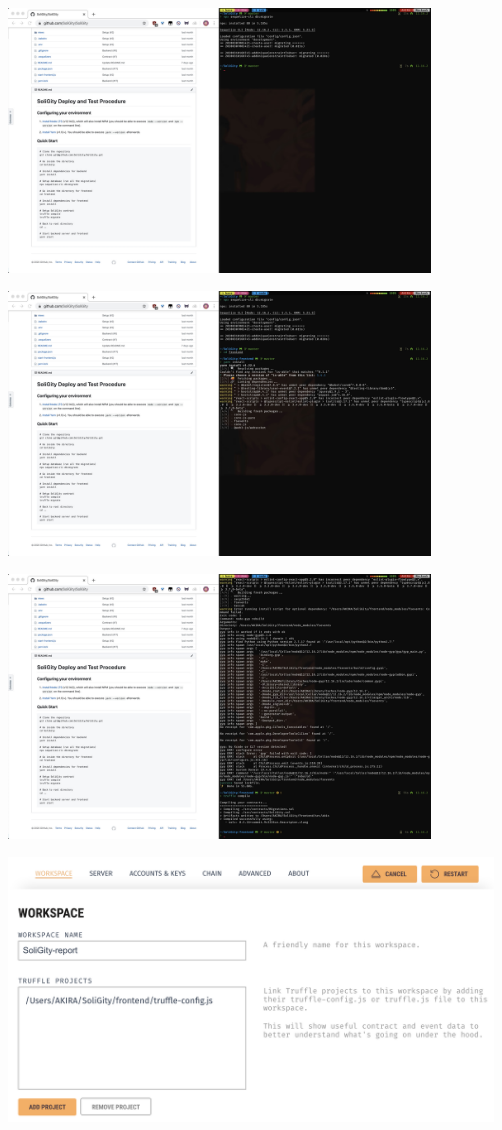 \documentclass[12pt]{article}
\renewcommand{\_}{\kern-1.5pt\textunderscore\kern-1.5pt}
\begin{document}
\begin{enumerate}
	      \includegraphics[height=7cm]{graphs/03. user_db_migrate}

	      \includegraphics[height=7cm]{graphs/04. yarn_install_frontend}

	      \includegraphics[height=7cm]{graphs/05. truffle_compile}

	      \includegraphics[height=7cm]{graphs/06. ganache_setup}


\end{enumerate}
\end{document}
